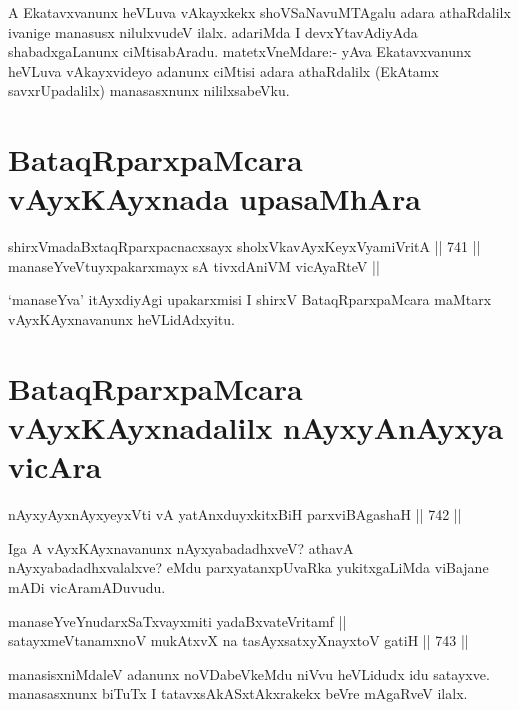 \begin{artha} 
A Ekatavxvanunx heVLuva vAkayxkekx shoVSaNavuMTAgalu adara athaRdalilx 
ivanige manasusx nilulxvudeV ilalx. adariMda I devxYtavAdiyAda 
shabadxgaLanunx ciMtisabAradu. matetxVneMdare:- yAva Ekatavxvanunx 
heVLuva vAkayxvideyo adanunx ciMtisi adara athaRdalilx (EkAtamx 
savxrUpadalilx) manasasxnunx nililxsabeVku.
\end{artha}

\section*{BataqRparxpaMcara vAyxKAyxnada upasaMhAra}

\begin{shl}
shirxVmadaBxtaqRparxpacnacxsayx sholxVkavAyxKeyxVyamiVritA \hfill || 741 ||  \\
manaseYveVtuyxpakarxmayx sA tivxdAniVM vicAyaRteV ||
\end{shl}

\begin{artha} 
`manaseYva' itAyxdiyAgi upakarxmisi I shirxV BataqRparxpaMcara maMtarx vAyxKAyxnavanunx heVLidAdxyitu.
\end{artha}

\section*{BataqRparxpaMcara vAyxKAyxnadalilx nAyxyAnAyxya vicAra}

\begin{shl}
nAyxyAyx\s nAyxyeyxVti vA yatAnxduyxkitxBiH parxviBAgashaH \hfill || 742 ||  
\end{shl}

\begin{artha} 
Iga A vAyxKAyxnavanunx nAyxyabadadhxveV? athavA nAyxyabadadhxvalalxve? eMdu parxyatanxpUvaRka yukitxgaLiMda viBajane mADi vicAramADuvudu.
\end{artha}


\begin{shl}
manaseYveYnudarxSaTxvayxmiti yadaBxvateVritamf || \\
satayxmeVtanamxnoV mukAtxvX na tasAyxsatxyXnayxtoV gatiH \hfill || 743 ||  
\end{shl}

\begin{artha} 
manasisxniMdaleV adanunx noVDabeVkeMdu niVvu heVLidudx idu satayxve. manasasxnunx biTuTx I tatavxsAkASxtAkxrakekx beVre mAgaRveV ilalx.
\end{artha}

